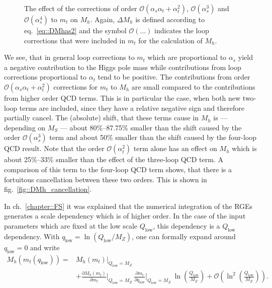 \documentclass[a4paper,12pt]{book}
\begin{document}
\begin{figure}[h]
\begin{minipage}[t]{0.5\textwidth}
\captionsetup{width=.8\textwidth}
\caption{The effect of the corrections of order $\mathcal{O}(\alpha_s\alpha_t+\alpha_t^2)$, $\mathcal{O}(\alpha_s^3)$ and $\mathcal{O}(\alpha_s^4)$ to $m_t$ on $M_h$. Again, $\Delta M_h$ is defined according to eq.\ \eqref{eq::DMhas2} and the symbol $\mathcal{O}(...)$ indicates the loop corrections that were included in $m_t$ for the calculation of $M_h$.}
\label{fig::DMh_MS_mt3L4LQCD}
\end{minipage}
\end{figure}\par 
We see, that in general loop corrections to $m_t$ which are proportional to $\alpha_s$ yield a negative contribution to the Higgs pole mass while contributions from loop corrections proportional to $\alpha_t$ tend to be positive. The contributions from order $\mathcal{O}(\alpha_s\alpha_t+\alpha_t^2)$ corrections for $m_t$ to $M_h$ are small compared to the contributions from higher order QCD terms. This is in particular the case, when both new two-loop terms are included, since they have a relative negative sign and therefore partially cancel. The (absolute) shift, that these terms cause in $M_h$ is --- depending on $M_S$ --- about 80\%--87.75\% smaller than the shift caused by the order $\mathcal{O}(\alpha_s^3)$ term and about 50\% smaller than the shift caused by the four-loop QCD result. Note that the order $\mathcal{O}(\alpha_t^2)$ term alone has an effect on $M_h$ which is about 25\%--33\% smaller than the effect of the three-loop QCD term. A comparison of this term to the four-loop QCD term shows, that there is a fortuitous cancellation between these two orders. This is shown in fig.\ \ref{fig::DMh_cancellation}.\par
In ch.\ \ref{chapter::FS} it was explained that the numerical integration of the RGEs generates a scale dependency which is of higher order. In the case of the input parameters which are fixed at the low scale $Q_\text{low}$, this dependency is a $Q_\text{low}$ dependency. With $q_\text{low}=\ln\left(Q_\text{low}/M_Z\right)$, one can formally expand around $q_\text{low} = 0$ and write
\begin{align}
\nonumber
M_h(m_t(q_\text{low}))={}&M_h(m_t)\big|_{Q_\text{low}=M_Z}\\
&+ \frac{\partial M_h(m_t)}{\partial m_t}\bigg|_{Q_\text{low}=M_Z} \>\frac{\partial m_t}{\partial q_\text{low}}\bigg|_{Q_\text{low}=M_Z}\> \ln\left(\frac{Q_\text{low}}{M_Z}\right) +\mathcal{O}\left(\ln^2\left(\frac{Q_\text{low}}{M_Z}\right)\right). 
\end{align} 
\end{document}

